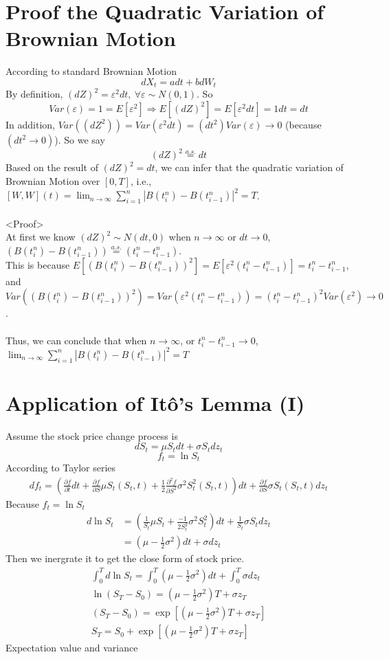 \documentclass[12pt]{article}
\begin{document}
\section{Proof the Quadratic Variation of Brownian Motion}
According to standard Brownian Motion
\[
    dX_t = adt + bdW_t  
\]
By definition, $(dZ)^2 = \varepsilon^2 dt,\ \forall \varepsilon\sim N(0, 1)$. So
\[
    Var(\varepsilon) = 1 = E[\varepsilon^2] \Rightarrow E[(dZ)^2] = E[\varepsilon^2 dt] = 1dt = dt  
\]
In addition, $Var((dZ^2)) = Var(\varepsilon^2 dt) = (dt^2)Var(\varepsilon) \to 0$ (because $(dt^2\to 0)$). So we say
\[
    (dZ)^2 \stackrel{a.s.}{=} dt
\]  
Based on the result of $(dZ)^2 = dt$, we can infer that the quadratic variation of Brownian Motion over $[0, T]$, i.e., $[W,W](t) = \lim_{n\to\infty}\sum_{i=1}^n|B(t_i^n)-B(t_{i-1}^n)|^2=T$.\\\\
<Proof>\\
At first we know $(dZ)^2\sim N(dt, 0)$ when $n\to\infty$ or $dt\to 0$, $(B(t_i^n)-B(t_{i-1}^n))\stackrel{a.s.}{=}(t_i^n-t_{i-1}^n)$.\\
This is because $E[(B(t_i^n)-B(t_{i-1}^n))^2] = E[\varepsilon^2(t_i^n-t_{i-1}^n)] = t_i^n - t_{i-1}^n$, and\\
$Var((B(t_i^n)-B(t_{i-1}^n))^2) = Var(\varepsilon^2(t_i^n-t_{i-1}^n)) = (t_i^n - t_{i-1}^n)^2Var(\varepsilon^2)\to 0$.\\\\
Thus, we can conclude that when $n\to \infty$, or $t_i^n-t_{i-1}^n \to 0$, $\lim_{n\to\infty}\sum_{i=1}^n|B(t_i^n)-B(t_{i-1}^n)|^2=T$






\newpage
\section{Application of It\^o's Lemma (I)}
Assume the stock price change process is
\[
    dS_t = \mu S_t dt + \sigma S_t dz_t  
\]
\[
    f_t = \ln S_t
\]  
According to Taylor series
\begin{align*}
    df_t = (\frac{\partial f}{\partial t}dt+\frac{\partial f}{\partial S}\mu S_t(S_t, t)+\frac{1}{2}\frac{\partial^2f}{\partial S^2}\sigma^2 S_t^2(S_t, t))dt + \frac{\partial f}{\partial S}\sigma S_t(S_t, t)dz_t
\end{align*}
Because $f_t = \ln S_t$
\begin{align*}
    d\ln S_t &= (\frac{1}{S_t}\mu S_t + \frac{-1}{2S_t^2}\sigma^2S_t^2)dt + \frac{1}{S_t}\sigma S_t dz_t\\
    &= (\mu - \frac{1}{2}\sigma^2)dt + \sigma dz_t
\end{align*}
Then we inergrate it to get the close form of stock price.
\begin{align*}
   \int_0^T d\ln S_t = \int_0^T (\mu - \frac{1}{2}\sigma^2)dt + \int_0^T \sigma dz_t\\
   \ln(S_T-S_0) = (\mu-\frac{1}{2}\sigma^2)T + \sigma z_T\\
   (S_T-S_0) = \exp{[(\mu-\frac{1}{2}\sigma^2)T + \sigma z_T]}\\
   S_T = S_0 + \exp{[(\mu-\frac{1}{2}\sigma^2)T + \sigma z_T]} 
\end{align*}
Expectation value and variance
\newpage
\end{document}
